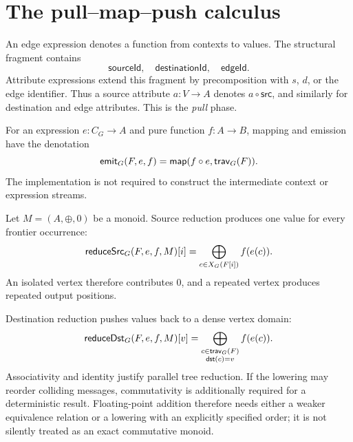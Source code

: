 \section{The pull--map--push calculus}

An edge expression denotes a function from contexts to values.  The structural
fragment contains
\[
  \mathsf{sourceId},\quad \mathsf{destinationId},\quad \mathsf{edgeId}.
\]
Attribute expressions extend this fragment by precomposition with $s$, $d$, or
the edge identifier.  Thus a source attribute $a:V\to A$ denotes
$a\circ\mathsf{src}$, and similarly for destination and edge attributes.  This
is the \emph{pull} phase.

For an expression $e:C_G\to A$ and pure function $f:A\to B$, mapping and
emission have the denotation
\[
  \mathsf{emit}_G(F,e,f)=\mathsf{map}(f\circ e,\mathsf{trav}_G(F)).
\]
The implementation is not required to construct the intermediate context or
expression streams.

Let $M=(A,\oplus,0)$ be a monoid.  Source reduction produces one value for
every frontier occurrence:
\[
  \mathsf{reduceSrc}_G(F,e,f,M)[i]
  = \mathop{\bigoplus}_{c\in X_G(F[i])} f(e(c)).
\]
An isolated vertex therefore contributes $0$, and a repeated vertex produces
repeated output positions.

Destination reduction pushes values back to a dense vertex domain:
\[
  \mathsf{reduceDst}_G(F,e,f,M)[v]
  = \mathop{\bigoplus}_{\substack{c\in\mathsf{trav}_G(F)\\\mathsf{dst}(c)=v}}
      f(e(c)).
\]
Associativity and identity justify parallel tree reduction.  If the lowering
may reorder colliding messages, commutativity is additionally required for a
deterministic result.  Floating-point addition therefore needs either a weaker
equivalence relation or a lowering with an explicitly specified order; it is
not silently treated as an exact commutative monoid.
